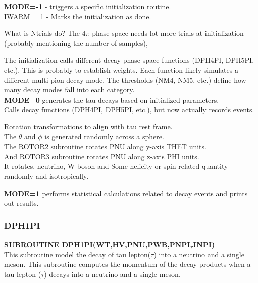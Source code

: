 \documentclass[12pt]{article}
\begin{document}
\textbf{MODE=-1}  - triggers a specific initialization routine.\\
IWARM = 1 -  Marks the initialization as done.


What is Ntrials do? The 4$\pi$ phase space needs lot more trials at initialization (probably mentioning the number of samples), 

The initialization calls different decay phase space functions (DPH4PI, DPH5PI, etc.). This is probably to establish weights. Each function likely simulates a different multi-pion decay mode. The thresholds (NM4, NM5, etc.) define how many decay modes fall into each category.\\

\vspace{0.5cm}
\textbf{MODE=0} generates the tau decays based on initialized parameters.\\
Calls decay functions (DPH4PI, DPH5PI, etc.), but now actually records events.

Rotation transformations to align with tau rest frame.\\

The $\theta$ and $\phi$ is generated randomly across a sphere. \\

The ROTOR2 subroutine rotates PNU along y-axis THET units.\\
And ROTOR3 subroutine rotates PNU along z-axis PHI units.\\

It rotates, neutrino, W-boson and Some helicity or spin-related quantity randomly and isotropically.

\vspace{0.5cm}
\textbf{MODE=1} performs statistical calculations related to decay events and prints out results.



\subsubsection{DPH1PI}
\textbf{SUBROUTINE DPH1PI(WT,HV,PNU,PWB,PNPI,JNPI)}\\

This subroutine model the decay of tau lepton($\tau$) into a neutrino and a single meson. This subroutine computes the momentum of the decay products when a tau lepton ($\tau$) decays into a neutrino and a single meson.
\end{document}
